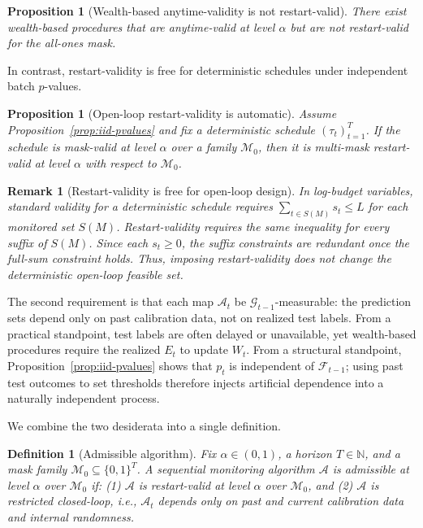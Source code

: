 \documentclass{uai2026} %
\newtheorem{proposition}[theorem]{Proposition}
\newtheorem{definition}[theorem]{Definition}
\newtheorem*{remark}{Remark}
\newcommand{\N}{\mathbb{N}}
\newcommand{\1}{\mathbf{1}}
\newcommand{\F}{\mathcal{F}}
\newcommand{\G}{\mathcal{G}}
\newcommand{\mcal}{\mathcal{M}}
\newcommand{\acal}{\mathcal{A}}
\begin{document}
\begin{proposition}[Wealth-based anytime-validity is not restart-valid]
  \label{prop:wealth-not-restart}
  There exist wealth-based procedures that are anytime-valid at level $\alpha$ but are not restart-valid for the all-ones mask.
\end{proposition}

In contrast, restart-validity is free for deterministic schedules under independent batch $p$-values.

\begin{proposition}[Open-loop restart-validity is automatic]
  \label{prop:open-loop-restart}
  Assume Proposition~\ref{prop:iid-pvalues} and fix a deterministic schedule $(\tau_t)_{t=1}^T$.
  If the schedule is mask-valid at level $\alpha$ over a family $\mcal_0$, then it is multi-mask restart-valid at level $\alpha$ with respect to $\mcal_0$.
\end{proposition}

\begin{remark}[Restart-validity is free for open-loop design]
  In log-budget variables, standard validity for a deterministic schedule requires $\sum_{t\in S(M)} s_t\le L$ for each monitored set $S(M)$.
  Restart-validity requires the same inequality for every suffix of $S(M)$.
  Since each $s_t\ge 0$, the suffix constraints are redundant once the full-sum constraint holds.
  Thus, imposing restart-validity does not change the deterministic open-loop feasible set.
\end{remark}

\label{sec:calibration-measurability}

The second requirement is that each map $\acal_t$ be $\G_{t-1}$-measurable: the prediction sets depend only on past calibration data, not on realized test labels.
From a practical standpoint, test labels are often delayed or unavailable, yet wealth-based procedures require the realized $E_t$ to update $W_t$.
From a structural standpoint, Proposition~\ref{prop:iid-pvalues} shows that $p_t$ is independent of $\F_{t-1}$; using past test outcomes to set thresholds therefore injects artificial dependence into a naturally independent process.

We combine the two desiderata into a single definition.

\begin{definition}[Admissible algorithm]
  \label{def:admissible}
  Fix $\alpha\in(0,1)$, a horizon $T\in\N$, and a mask family $\mcal_0\subseteq\{0,1\}^T$.
  A sequential monitoring algorithm $\acal$ is \emph{admissible} at level $\alpha$ over $\mcal_0$ if: (1) $\acal$ is restart-valid at level $\alpha$ over $\mcal_0$, and (2) $\acal$ is restricted closed-loop, i.e., $\acal_t$ depends only on past and current calibration data and internal randomness.
\end{definition}
\end{document}
